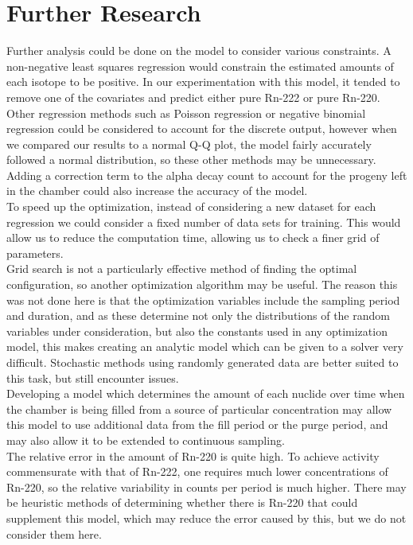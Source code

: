 \documentclass[11pt]{m2pi}
\begin{document}
\section{Further Research}
Further analysis could be done on the model to consider various constraints. A non-negative least squares regression would constrain the estimated amounts of each isotope to be positive.  In our experimentation with this model, it tended to remove one of the covariates and predict either pure Rn-222 or pure Rn-220. Other regression methods such as Poisson regression or negative binomial regression could be considered to account for the discrete output, however when we compared our results to a normal Q-Q plot, the model fairly accurately followed a normal distribution, so these other methods may be unnecessary. Adding a correction term to the alpha decay count to account for the progeny left in the chamber could also increase the accuracy of the model. \\

To speed up the optimization, instead of considering a new dataset for each regression we could consider a fixed number of data sets for training. This would allow us to reduce the computation time, allowing us to check a finer grid of parameters. \\

Grid search is not a particularly effective method of finding the optimal configuration, so another optimization algorithm may be useful. The reason this was not done here is that the optimization variables include the sampling period and duration, and as these determine not only the distributions of the random variables under consideration, but also the constants used in any optimization model, this makes creating an analytic model which can be given to a solver very difficult. Stochastic methods using randomly generated data are better suited to this task, but still encounter issues.\\

Developing a model which determines the amount of each nuclide over time when the chamber is being filled from a source of particular concentration may allow this model to use additional data from the fill period or the purge period, and may also allow it to be extended to continuous sampling.\\

The relative error in the amount of Rn-220 is quite high. To achieve activity commensurate with that of Rn-222, one requires much lower concentrations of Rn-220, so the relative variability in counts per period is much higher. There may be heuristic methods of determining whether there is Rn-220 that could supplement this model, which may reduce the error caused by this, but we do not consider them here.\\
\end{document}
